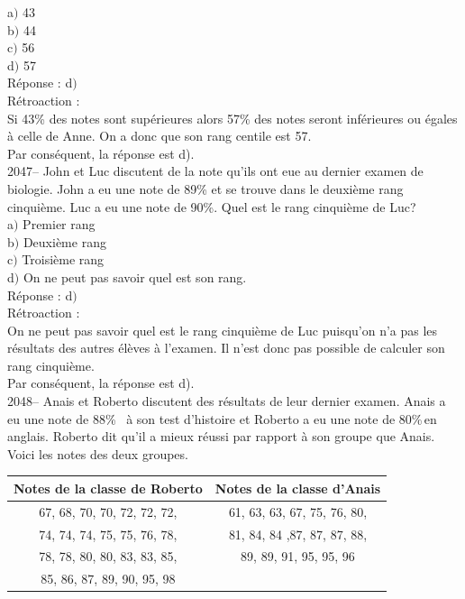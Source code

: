 \documentclass[letterpaper, 12pt]{article}
\begin{document}
a$)$ 43\\
b$)$ 44\\
c$)$ 56\\
d$)$ 57\\

R\'eponse : d$)$\\

R\'etroaction :\\
Si 43\% des notes sont sup\'erieures alors 57\% des notes seront inf\'erieures ou \'egales \`a celle de Anne. On a donc que son rang centile est 57.\\
Par cons\'equent, la r\'eponse est d).\\

2047-- John et Luc discutent de la note qu'ils ont eue au dernier examen de biologie. John a eu une note de 89\% et se trouve dans le deuxi\`eme rang cinqui\`eme. Luc a eu une note de 90\%. Quel est le rang cinqui\`eme de Luc? \\

a$)$ Premier rang \\
b$)$ Deuxi\`eme rang \\
c$)$ Troisi\`eme rang\\
d$)$ On ne peut pas savoir quel est son rang.\\

R\'eponse : d$)$\\

R\'etroaction :\\
On ne peut pas savoir quel est le rang cinqui\`eme de Luc puisqu'on n'a pas les r\'esultats des autres \'el\`eves \`a l'examen. Il n'est donc pas possible de calculer son rang cinqui\`eme.\\
Par cons\'equent, la r\'eponse est d).\\


2048-- Anais et Roberto discutent des r\'esultats de leur dernier examen. Anais a eu une note de 88\% \, \`a son test d'histoire et Roberto a eu une note de 80\%\,en anglais. Roberto dit qu'il a mieux r\'eussi par rapport \`a son groupe que Anais. Voici les notes des deux groupes.
\begin{center}
 \begin{tabular}{|c|c|} \hline
{\bf Notes de la classe de Roberto } & {\bf Notes de la classe d'Anais }\\  \hline

67, 68, 70, 70, 72, 72, 72, & 61, 63, 63, 67, 75, 76, 80, \\
74, 74, 74, 75, 75, 76, 78, & 81, 84, 84 ,87, 87, 87, 88, \\
78, 78, 80, 80, 83, 83, 85, & 89, 89, 91, 95, 95, 96\\
85, 86, 87, 89, 90, 95, 98  & \\ \hline
\end{tabular}
\end{center}
\end{document}
